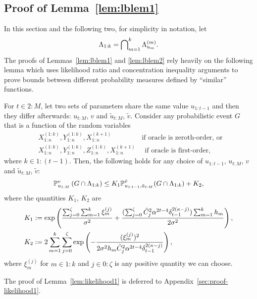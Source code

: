 \subsection{Proof of Lemma~\ref{lem:lblem1}}
\label{sec:proof-lblem1}
In this section and the following two, for simplicity in notation, let 
\begin{equation*}
	\Lambda_{1:{k}} = \bigcap\nolimits_{m=1}^k \Lambda_{u_{m}}^{({m})}.
\end{equation*}
The proofs of Lemmas~\ref{lem:lblem1} and \ref{lem:lblem2}
rely heavily on the following lemma which uses likelihood ratio and concentration inequality arguments
to prove bounds between different probability measures defined by ``similar'' functions.
\begin{lemma}
	\label{lem:likelihood1}
	For $t \in 2:M$, 
	let two sets of parameters share the same value $u_{1:t-1}$ and 
	then they differ afterwards: $u_{t:M}$, $v$ and $\tilde u_{t:M}$, $\tilde v$.
	Consider any probabilistic event $G$ that is a function of the random variables 
	\begin{align*}
		&X_{1:n}^{(1:k)}, Y_{1:n}^{(1:k)}, X_{1:n}^{(k+1)} 
		\quad\quad\quad\quad \text{ if oracle is zeroth-order, or }\\
		&X_{1:n}^{(1:k)}, Y_{1:n}^{(1:k)}, Z_{1:n}^{(1:k)}, X_{1:n}^{(k+1)}
		\quad \text{ if oracle is first-order,}
	\end{align*}
	where $k \in 1:(t-1)$.
	Then, the following holds for any choice of $u_{1:t-1}$, $u_{t:M}$, $v$ and $\tilde u_{t:M}$, $\tilde v$:
	\begin{equation*}
		\mathbb{P}_{u_{1:M}}^v \left( G \cap \Lambda_{1:{k}} \right)\leq K_1 \mathbb{P}_{u_{1:t-1}, \tilde u_{t:M}}^{\tilde v} ( G \cap \Lambda_{1:{k}} ) + K_2,
	\end{equation*}
	where the quantities $K_1$, $K_2$ are
	\begin{align*}
		K_1 &:= \exp \left ( \frac{\sum_{j=0}^\zeta \sum_{m=1}^{k} \xi_m^{(j)}}{\sigma^2} + 
		\frac {(\sum_{j=0}^\zeta \tilde C_j^2 \alpha^{2t-4} \delta_{t-1}^{2(\kappa-j)}) \sum_{m=1}^k h_m}{2 \sigma^2}  \right ),\\
		K_2 &:= 2 \sum_{m=1}^{k} \sum_{j=0}^{\zeta}
		\exp \left (  -\frac {(\xi_m^{(j)})^2}{2 \sigma^2  h_{m} \tilde C_j^2 \alpha^{2t-4} \delta_{t-1}^{2(\kappa-j)}}  \right ),
	\end{align*}
	where $\xi_m^{(j)}$ for $m \in 1:k$ and $j \in 0:\zeta$ is any positive quantity we can choose. 
\end{lemma}
The proof of Lemma~\ref{lem:likelihood1} is deferred to Appendix~\ref{sec:proof-likelihood1}.

